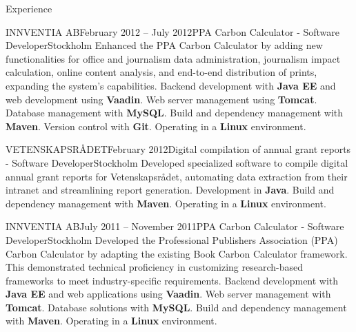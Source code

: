 \documentclass{resume}
\begin{document}
\begin{rSection}{Experience}
    \begin{rSubsection}{INNVENTIA AB}{February 2012 -- July 2012}{PPA Carbon Calculator - Software Developer}{Stockholm}
      \bItem Enhanced the PPA Carbon Calculator by adding new functionalities for office and journalism data administration, journalism impact calculation, online content analysis, and end-to-end distribution of prints, expanding the system's capabilities.
      \techItem Backend development with \textbf{Java EE} and web development using \textbf{Vaadin}. Web server management using \textbf{Tomcat}. Database management with \textbf{MySQL}. Build and dependency management with \textbf{Maven}. Version control with \textbf{Git}. Operating in a \textbf{Linux} environment.
    \end{rSubsection}

    \begin{rSubsection}{VETENSKAPSRÅDET}{February 2012}{Digital compilation of annual grant reports - Software Developer}{Stockholm}
      \bItem Developed specialized software to compile digital annual grant reports for Vetenskapsrådet, automating data extraction from their intranet and streamlining report generation.
      \techItem Development in \textbf{Java}. Build and dependency management with \textbf{Maven}. Operating in a \textbf{Linux} environment.
    \end{rSubsection}

    \begin{rSubsection}{INNVENTIA AB}{July 2011 -- November 2011}{PPA Carbon Calculator - Software Developer}{Stockholm}
      \bItem Developed the Professional Publishers Association (PPA) Carbon Calculator by adapting the existing Book Carbon Calculator framework. This demonstrated technical proficiency in customizing research-based frameworks to meet industry-specific requirements.
      \techItem Backend development with \textbf{Java EE} and web applications using \textbf{Vaadin}. Web server management with \textbf{Tomcat}. Database solutions with \textbf{MySQL}. Build and dependency management with \textbf{Maven}. Operating in a \textbf{Linux} environment.
    \end{rSubsection}
  \end{rSection}
  \pagebreak
\end{document}
